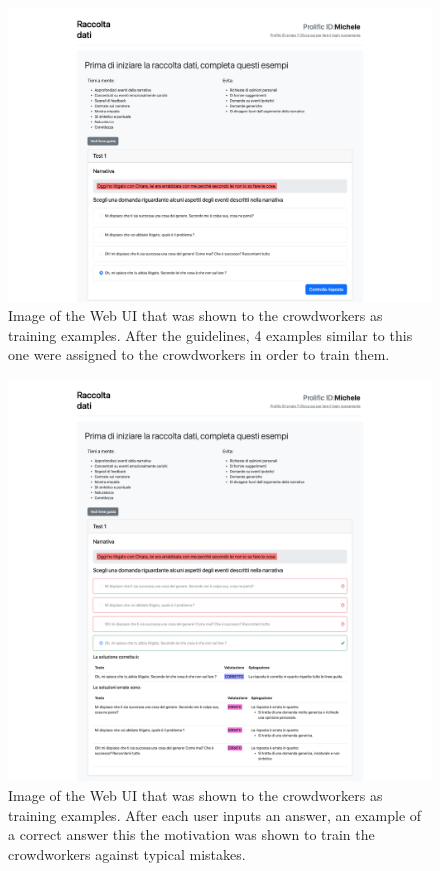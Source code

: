 \begin{figure}[!htbp]
    \centering
    \includegraphics[width=1\linewidth]{assets//imgs/UI-examples-1.png}
    \caption{Image of the Web UI that was shown to the crowdworkers as training examples. After the guidelines, 4 examples similar to this one were assigned to the crowdworkers in order to train them.}
    \label{fig:data_collection_web:2}
\end{figure}
\begin{figure}[!htbp]
    \centering
    \includegraphics[width=1\linewidth]{assets//imgs/UI-examples-completed-1.png}
    \caption{Image of the Web UI that was shown to the crowdworkers as training examples. After each user inputs an answer, an example of a correct answer this the motivation was shown to train the crowdworkers against typical mistakes.}
    \label{fig:data_collection_web:3}
\end{figure}

